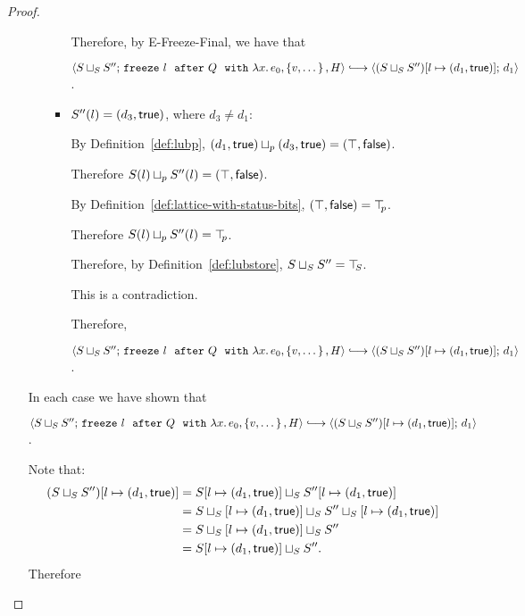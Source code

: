 \begin{proof}
\begin{itemize}
\begin{itemize}
\begin{itemize}
          Therefore, by {\sc E-Freeze-Final}, we have that

          $\config{\lubstore{S}{S''}}{\freezeafterfull{l}{Q}{\lam{x}{e_0}}{\setof{v,
                \dots}}{H}} \parstepsto
          \config{\extS{(\lubstore{S}{S''})}{l}{d_1}{\frozentrue}}{d_1}$.

        \item $S''(l) = (d_3, \textsf{true})$, where $d_3 \neq d_1$:

          By Definition~\ref{def:lubp},
          $(d_1, \textsf{true}) \sqcup_p (d_3, \textsf{true})
          = (\top, \textsf{false})$.

          Therefore $S(l) \sqcup_p S''(l) = (\top, \textsf{false})$.

          By Definition~\ref{def:lattice-with-status-bits},
          $(\top, \textsf{false}) = \top\hspace{-0.85mm}_{p}$.

          Therefore $S(l) \sqcup_p S''(l) = \top\hspace{-0.85mm}_{p}$.

          Therefore, by Definition~\ref{def:lubstore},
          $S \sqcup_{S} S'' = \top\hspace{-0.85mm}_{S}$.

          This is a contradiction.

          Therefore,

          $\config{\lubstore{S}{S''}}{\freezeafterfull{l}{Q}{\lam{x}{e_0}}{\setof{v,
                \dots}}{H}} \parstepsto
          \config{\extS{(\lubstore{S}{S''})}{l}{d_1}{\frozentrue}}{d_1}$.
        \end{itemize}
      \end{itemize}

      In each case we have shown that

      $\config{\lubstore{S}{S''}}{\freezeafterfull{l}{Q}{\lam{x}{e_0}}{\setof{v,
            \dots}}{H}} \parstepsto
      \config{\extS{(\lubstore{S}{S''})}{l}{d_1}{\frozentrue}}{d_1}$.

      Note that:
      \begin{align*}
        (S \sqcup_{S} S'')[l \mapsto (d_1, \textsf{true})] &=
        S[l \mapsto (d_1, \textsf{true})] \sqcup_{S} S''[l \mapsto (d_1, \textsf{true})] \\
        &= S \sqcup_{S} \left[ l \mapsto (d_1, \textsf{true}) \right] \sqcup_{S} S'' \sqcup_{S} \left[ l \mapsto (d_1, \textsf{true}) \right] \\
        &= S \sqcup_{S} \left[ l \mapsto (d_1, \textsf{true}) \right] \sqcup_{S} S'' \\
        &= S[l \mapsto (d_1, \textsf{true})] \sqcup_{S} S''.
      \end{align*}
      Therefore


\end{itemize}
\end{proof}
